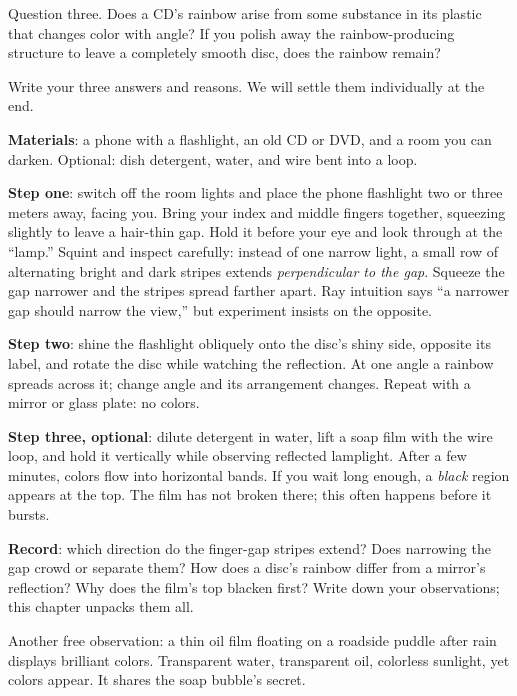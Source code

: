 Question three. Does a CD's rainbow arise from some substance in its plastic that changes color with angle? If you polish away the rainbow-producing structure to leave a completely smooth disc, does the rainbow remain?

Write your three answers and reasons. We will settle them individually at the end.


\begin{experiment}
\textbf{Materials}: a phone with a flashlight, an old CD or DVD, and a room you can darken. Optional: dish detergent, water, and wire bent into a loop.

\textbf{Step one}: switch off the room lights and place the phone flashlight two or three meters away, facing you. Bring your index and middle fingers together, squeezing slightly to leave a hair-thin gap. Hold it before your eye and look through at the ``lamp.'' Squint and inspect carefully: instead of one narrow light, a small row of alternating bright and dark stripes extends \emph{perpendicular to the gap}. Squeeze the gap narrower and the stripes spread farther apart. Ray intuition says ``a narrower gap should narrow the view,'' but experiment insists on the opposite.

\textbf{Step two}: shine the flashlight obliquely onto the disc's shiny side, opposite its label, and rotate the disc while watching the reflection. At one angle a rainbow spreads across it; change angle and its arrangement changes. Repeat with a mirror or glass plate: no colors.

\textbf{Step three, optional}: dilute detergent in water, lift a soap film with the wire loop, and hold it vertically while observing reflected lamplight. After a few minutes, colors flow into horizontal bands. If you wait long enough, a \emph{black} region appears at the top. The film has not broken there; this often happens before it bursts.

\textbf{Record}: which direction do the finger-gap stripes extend? Does narrowing the gap crowd or separate them? How does a disc's rainbow differ from a mirror's reflection? Why does the film's top blacken first? Write down your observations; this chapter unpacks them all.
\end{experiment}

Another free observation: a thin oil film floating on a roadside puddle after rain displays brilliant colors. Transparent water, transparent oil, colorless sunlight, yet colors appear. It shares the soap bubble's secret.

